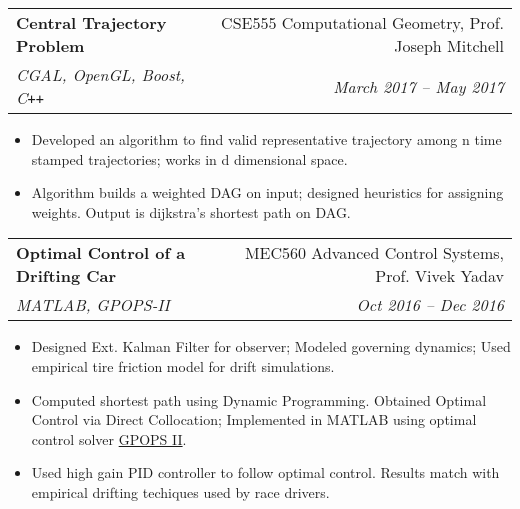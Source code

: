 \documentclass[letterpaper,10pt]{article}
\makeatletter
\newcommand{\resumeHeading}[4]{
  \vspace{-1pt}
    \begin{tabular*}{0.97\textwidth}{l@{\extracolsep{\fill}}r}
      \textbf{#1} & #2 \vspace{-2pt}\\ \vspace{1pt}
      \textit{\small#3} & \textit{\small #4} \\
    \end{tabular*}
}
\newcommand{\resumeItemListStart}{
\vspace{-7pt}
\begin{itemize}[leftmargin=14pt]
}
\newcommand{\resumeItemListEnd}{
\vspace{+7pt}
\end{itemize}
}
\newcommand{\resumeItem}[1]{
  \item\small{
      {#1 \vspace{-7pt}
      }
  }
}
\makeatother
\begin{document}
    \resumeHeading{Central Trajectory Problem}{CSE555 Computational Geometry, Prof. Joseph Mitchell}{CGAL, OpenGL, Boost, C\texttt{++}}{March 2017 -- May 2017}
    \resumeItemListStart
      \resumeItem{Developed an algorithm to find valid representative trajectory among n time stamped trajectories; works in d dimensional space.}
      \resumeItem{Algorithm builds a weighted DAG on input; designed heuristics for assigning weights. Output is dijkstra's shortest path on DAG.}
    \resumeItemListEnd

\vspace{-10pt}
    \resumeHeading{Optimal Control of a Drifting Car}{MEC560 Advanced Control Systems, Prof. Vivek Yadav}{MATLAB, GPOPS-II}{Oct 2016 -- Dec 2016}
    \resumeItemListStart
      \resumeItem{Designed Ext. Kalman Filter for observer; Modeled governing dynamics; Used empirical tire friction model for drift simulations.}
      \resumeItem{Computed shortest path using Dynamic Programming. Obtained Optimal Control via Direct Collocation; Implemented in MATLAB using optimal control solver \href{http://www.gpops2.com/}{GPOPS II}.}
      \resumeItem{Used high gain PID controller to follow optimal control. Results match with empirical drifting techiques used by race drivers.}
    \resumeItemListEnd



\end{document}
